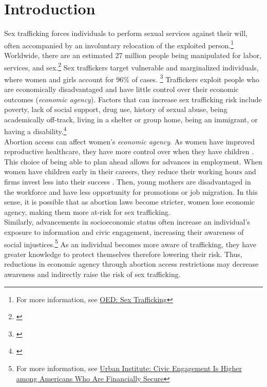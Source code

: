 \documentclass[10pt]{article}
\begin{document}
\section{Introduction}
Sex trafficking forces individuals to perform sexual services against their will, often accompanied by an involuntary relocation of the exploited person.\footnote{For more information, see \href{https://www.oed.com/dictionary/sex-trafficking_n}{OED: Sex Trafficking}} Worldwide, there are an estimated 27 million people being manipulated for labor, services, and sex.\footnote{\cite{traffickingreport}} Sex traffickers target vulnerable and marginalized individuals, where women and girls account for 96\% of cases. \footnote{\cite{ICAT}} Traffickers exploit people who are economically disadvantaged and have little control over their economic outcomes (\textit{economic agency}). Factors that can increase sex trafficking risk include poverty, lack of social support, drug use, history of sexual abuse, being academically off-track, living in a shelter or group home, being an immigrant, or having a disability.\footnote{\cite{riskfactors}}  \\
\indent Abortion access can affect women's \textit{economic agency}. As women have improved reproductive healthcare, they have more control over when they have children \citep{baileyandlindo}. This choice of being able to plan ahead allows for advances in employment. When women have children early in their careers, they reduce their working hours and firms invest less into their success \citep{BlauandKhan}. Then, young mothers are disadvantaged in the workforce and have less opportunity for promotions or job migration. In this sense, it is possible that as abortion laws become stricter, women lose economic agency, making them more at-risk for sex trafficking. \\
\indent Similarly, advancements in socioeconomic status often increase an individual’s exposure to information and civic engagement, increasing their awareness of social injustices.\footnote{For more information, see \href{https://www.urban.org/urban-wire/civic-engagement-higher-among-americans-who-are-financially-secure}{Urban Institute: Civic Engagement Is Higher among Americans Who Are Financially Secure}} As an individual becomes more aware of trafficking, they have greater knowledge to protect themselves therefore lowering their risk. Thus, reductions in economic agency through abortion access restrictions may decrease awareness and  indirectly raise the risk of sex trafficking. \\
\end{document}
